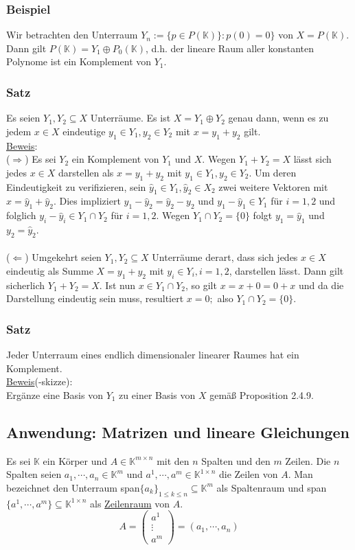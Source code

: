 \subsubsection{Beispiel}
Wir betrachten den Unterraum $Y_n:=\{p\in P(\mathbb{K})\}:p(0)=0\}$ von $X=P(\mathbb{K})$.  Dann gilt $P(\mathbb{K})=Y_1 \oplus P_0(\mathbb{K})$, d.h. der lineare Raum aller konstanten Polynome ist ein Komplement von $Y_1$.
\subsubsection{Satz}
Es seien $Y_1,Y_2\subseteq X$ Unterräume.  Es ist $X=Y_1\oplus Y_2$ genau dann, wenn es zu jedem $x\in X$ eindeutige $y_1\in Y_1,y_2\in Y_2$ mit $x=y_1+y_2$ gilt.\\
\underline{Beweis}:\\
($\Rightarrow$) Es sei $Y_2$ ein Komplement von $Y_1$ und $X$.  Wegen $Y_1+Y_2=X$ lässt sich jedes $x\in X$ darstellen als $x=y_1+y_2$ mit $y_1\in Y_1,y_2\in Y_2$.  Um deren Eindeutigkeit zu verifizieren, sein $\hat{y}_1\in Y_1,\hat{y}_2\in X_2$ zwei weitere Vektoren mit $x=\hat{y}_1+\hat{y}_2$.  Dies impliziert $y_1-\hat{y}_2=\hat{y}_2-y_2$ und $y_1-\hat{y}_1\in Y_1$ für $i=1,2$ und folglich $y_i-\hat{y}_i\in Y_1\cap Y_2$ für $i=1,2$.  Wegen $Y_1\cap Y_2 = \{0\}$ folgt $y_1=\hat{y}_1$ und $y_2=\hat{y}_2$.\\
\\
($\Leftarrow$) Umgekehrt seien $Y_1,Y_2\subseteq X$ Unterräume derart, dass sich jedes $x\in X$ eindeutig als Summe $X=y_1+y_2$ mit $y_i\in Y_i,i=1,2$, darstellen lässt.  Dann gilt sicherlich $Y_1+Y_2=X$.  Ist nun $x\in Y_1\cap Y_2$, so gilt $x=x+0=0+x$ und da die Darstellung eindeutig sein muss, resultiert $x=0;$ also $Y_1\cap Y_2=\{0\}$.
\subsubsection{Satz}
Jeder Unterraum eines endlich dimensionaler linearer Raumes hat ein Komplement.\\
\underline{Beweis}(-skizze):\\
Ergänze eine Basis von $Y_1$ zu einer Basis von $X$ gemäß Proposition 2.4.9.
\subsection{Anwendung: Matrizen und lineare Gleichungen}
Es sei $\mathbb{K}$ ein Körper und $A\in\mathbb{K}^{m\times n}$ mit den $n$ Spalten und den $m$ Zeilen.  Die $n$ Spalten seien $a_1,\cdots ,a_n\in \mathbb{K}^m$ und $a^1,\cdots ,a^m\in \mathbb{K}^{1\times n}$ die Zeilen von $A$.  Man bezeichnet den Unterraum span$\{a_k\}_{1\leq k\leq n}\subseteq \mathbb{K}^m$ als Spaltenraum und span$\{a^1,\cdots ,a^m\}\subseteq \mathbb{K}^{1\times n}$ als \underline{Zeilenraum} von $A$.
\[A=\begin{pmatrix}a^1\\ \vdots \\ a^m\end{pmatrix} = (a_1,\cdots ,a_n)\]

